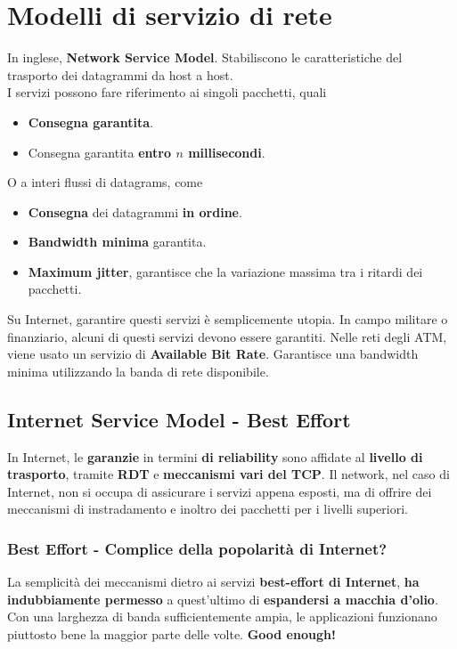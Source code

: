 \section{Modelli di servizio di rete}
In inglese, \textbf{Network Service Model}.
Stabiliscono le caratteristiche del trasporto dei datagrammi da host a host.\\
I servizi possono fare riferimento ai singoli pacchetti, quali
\begin{itemize}
	\item \textbf{Consegna garantita}.
	\item Consegna garantita \textbf{entro $n$ millisecondi}.
\end{itemize}
O a interi flussi di datagrams, come
\begin{itemize}
	\item \textbf{Consegna} dei datagrammi \textbf{in ordine}.
	\item \textbf{Bandwidth minima} garantita.
	\item \textbf{Maximum jitter}, garantisce che la variazione massima tra i ritardi dei pacchetti.
\end{itemize}

Su Internet, garantire questi servizi è semplicemente utopia. In campo militare o finanziario, alcuni di questi servizi devono essere garantiti. Nelle reti degli ATM, viene usato un servizio di \textbf{Available Bit Rate}. Garantisce una bandwidth minima utilizzando la banda di rete disponibile.

\subsection{Internet Service Model - Best Effort}
In Internet, le \textbf{garanzie} in termini \textbf{di reliability} sono affidate al \textbf{livello di trasporto}, tramite \textbf{RDT} e \textbf{meccanismi vari del TCP}. Il network, nel caso di Internet, non si occupa di assicurare i servizi appena esposti, ma di offrire dei meccanismi di instradamento e inoltro dei pacchetti per i livelli superiori.

\subsubsection{Best Effort - Complice della popolarità di Internet?}
La semplicità dei meccanismi dietro ai servizi \textbf{best-effort di Internet}, \textbf{ha indubbiamente permesso} a quest'ultimo di \textbf{espandersi a macchia d'olio}.\\
Con una larghezza di banda sufficientemente ampia, le applicazioni funzionano piuttosto bene la maggior parte delle volte. \textbf{Good enough!}
